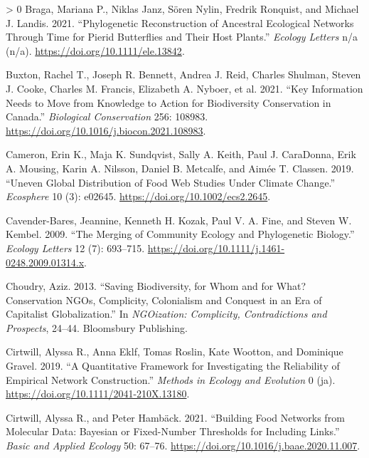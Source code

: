 \documentclass[11pt]{article}
\newlength{\cslhangindent}
\newenvironment{CSLReferences}[3] %
 {%
  \setlength{\parindent}{0pt}
  \ifodd #1 \everypar{\setlength{\hangindent}{\cslhangindent}}\ignorespaces\fi
  \ifnum #2 > 0
  \setlength{\parskip}{#2\baselineskip}
  \fi
 }%
 {}
\begin{document}
\begin{CSLReferences}{1}{0}
\leavevmode\hypertarget{ref-Braga2021PhyRec}{}%
Braga, Mariana P., Niklas Janz, Sören Nylin, Fredrik Ronquist, and
Michael J. Landis. 2021. {``Phylogenetic Reconstruction of Ancestral
Ecological Networks Through Time for Pierid Butterflies and Their Host
Plants.''} \emph{Ecology Letters} n/a (n/a).
\url{https://doi.org/10.1111/ele.13842}.

\leavevmode\hypertarget{ref-Buxton2021KeyInf}{}%
Buxton, Rachel T., Joseph R. Bennett, Andrea J. Reid, Charles Shulman,
Steven J. Cooke, Charles M. Francis, Elizabeth A. Nyboer, et al. 2021.
{``Key Information Needs to Move from Knowledge to Action for
Biodiversity Conservation in Canada.''} \emph{Biological Conservation}
256: 108983. \url{https://doi.org/10.1016/j.biocon.2021.108983}.

\leavevmode\hypertarget{ref-Cameron2019UneGlo}{}%
Cameron, Erin K., Maja K. Sundqvist, Sally A. Keith, Paul J. CaraDonna,
Erik A. Mousing, Karin A. Nilsson, Daniel B. Metcalfe, and Aimée T.
Classen. 2019. {``Uneven Global Distribution of Food Web Studies Under
Climate Change.''} \emph{Ecosphere} 10 (3): e02645.
\url{https://doi.org/10.1002/ecs2.2645}.

\leavevmode\hypertarget{ref-Cavender-Bares2009MerCom}{}%
Cavender-Bares, Jeannine, Kenneth H. Kozak, Paul V. A. Fine, and Steven
W. Kembel. 2009. {``The Merging of Community Ecology and Phylogenetic
Biology.''} \emph{Ecology Letters} 12 (7): 693--715.
\url{https://doi.org/10.1111/j.1461-0248.2009.01314.x}.

\leavevmode\hypertarget{ref-Choudry2013SavBio}{}%
Choudry, Aziz. 2013. {``Saving Biodiversity, for Whom and for What?
Conservation NGOs, Complicity, Colonialism and Conquest in an Era of
Capitalist Globalization.''} In \emph{NGOization: Complicity,
Contradictions and Prospects}, 24--44. Bloomsbury Publishing.

\leavevmode\hypertarget{ref-Cirtwill2019QuaFra}{}%
Cirtwill, Alyssa R., Anna Eklf, Tomas Roslin, Kate Wootton, and
Dominique Gravel. 2019. {``A Quantitative Framework for Investigating
the Reliability of Empirical Network Construction.''} \emph{Methods in
Ecology and Evolution} 0 (ja).
\url{https://doi.org/10.1111/2041-210X.13180}.

\leavevmode\hypertarget{ref-Cirtwill2021BuiFoo}{}%
Cirtwill, Alyssa R., and Peter Hambäck. 2021. {``Building Food Networks
from Molecular Data: Bayesian or Fixed-Number Thresholds for Including
Links.''} \emph{Basic and Applied Ecology} 50: 67--76.
\url{https://doi.org/10.1016/j.baae.2020.11.007}.


\end{CSLReferences}
\end{document}
